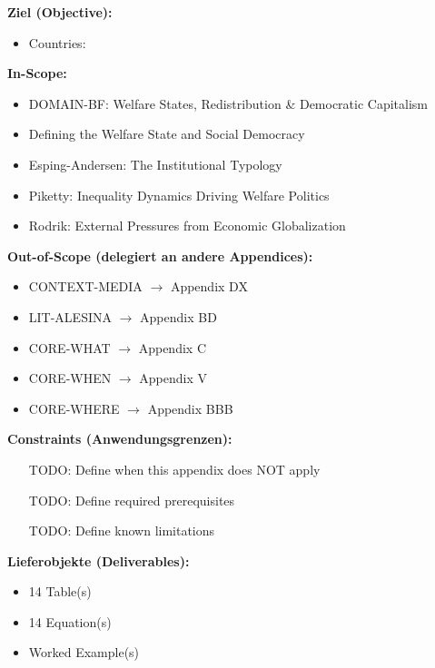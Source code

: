 \begin{tcolorbox}[
    colback=orange!5!white,
    colframe=orange!75!black,
    title={\textbf{Appendix Scope: Ziel / In-Scope / Out-of-Scope / Constraints}},
    fonttitle=\bfseries
]

\textbf{Ziel (Objective):}
\begin{itemize}[nosep]
    \item Countries:
\end{itemize}

\textbf{In-Scope:}
\begin{itemize}[nosep]
    \item DOMAIN-BF: Welfare States, Redistribution \& Democratic Capitalism
    \item Defining the Welfare State and Social Democracy
    \item Esping-Andersen: The Institutional Typology
    \item Piketty: Inequality Dynamics Driving Welfare Politics
    \item Rodrik: External Pressures from Economic Globalization
\end{itemize}

\textbf{Out-of-Scope (delegiert an andere Appendices):}
\begin{itemize}[nosep]
    \item CONTEXT-MEDIA $\rightarrow$ Appendix DX
    \item LIT-ALESINA $\rightarrow$ Appendix BD
    \item CORE-WHAT $\rightarrow$ Appendix C
    \item CORE-WHEN $\rightarrow$ Appendix V
    \item CORE-WHERE $\rightarrow$ Appendix BBB
\end{itemize}

\textbf{Constraints (Anwendungsgrenzen):}
\begin{itemize}[nosep]
    \item [TODO: Define when this appendix does NOT apply]
    \item [TODO: Define required prerequisites]
    \item [TODO: Define known limitations]
\end{itemize}

\textbf{Lieferobjekte (Deliverables):}
\begin{itemize}[nosep]
    \item 14 Table(s)
    \item 14 Equation(s)
    \item Worked Example(s)
\end{itemize}

\end{tcolorbox}



